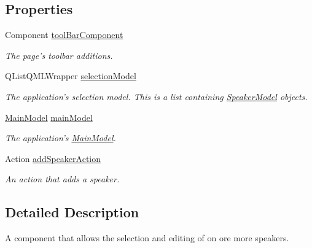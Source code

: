 \subsection*{Properties}
\begin{DoxyCompactItemize}
\item 
\hypertarget{classSpeakerPage_a3e35e3c23d511c7a048494deb3de57e8}{Component \hyperlink{classSpeakerPage_a3e35e3c23d511c7a048494deb3de57e8}{tool\-Bar\-Component}}\label{classSpeakerPage_a3e35e3c23d511c7a048494deb3de57e8}

\begin{DoxyCompactList}\small\item\em The page's toolbar additions. \end{DoxyCompactList}\item 
\hypertarget{classSpeakerPage_aca9be87a6fcb6622833e87861f3a92a7}{Q\-List\-Q\-M\-L\-Wrapper \hyperlink{classSpeakerPage_aca9be87a6fcb6622833e87861f3a92a7}{selection\-Model}}\label{classSpeakerPage_aca9be87a6fcb6622833e87861f3a92a7}

\begin{DoxyCompactList}\small\item\em The application's selection model. This is a list containing {\ttfamily \hyperlink{classSpeakerModel}{Speaker\-Model}} objects. \end{DoxyCompactList}\item 
\hypertarget{classSpeakerPage_a334a8bee32e6e8f32bbbd6c0836565e1}{\hyperlink{classMainModel}{Main\-Model} \hyperlink{classSpeakerPage_a334a8bee32e6e8f32bbbd6c0836565e1}{main\-Model}}\label{classSpeakerPage_a334a8bee32e6e8f32bbbd6c0836565e1}

\begin{DoxyCompactList}\small\item\em The application's {\ttfamily \hyperlink{classMainModel}{Main\-Model}}. \end{DoxyCompactList}\item 
\hypertarget{classSpeakerPage_ae1b16972611aaba445364e17ca414264}{Action \hyperlink{classSpeakerPage_ae1b16972611aaba445364e17ca414264}{add\-Speaker\-Action}}\label{classSpeakerPage_ae1b16972611aaba445364e17ca414264}

\begin{DoxyCompactList}\small\item\em An action that adds a speaker. \end{DoxyCompactList}\end{DoxyCompactItemize}


\subsection{Detailed Description}
A component that allows the selection and editing of on ore more speakers. 

